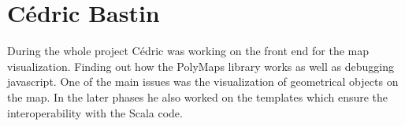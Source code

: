 \section{Cédric Bastin}

During the whole project Cédric was working on the front end for the map visualization. Finding out how the PolyMaps library works as well as debugging javascript. One of the main issues was the visualization of geometrical objects on the map. In the later phases he also worked on the templates which ensure the interoperability with the Scala code.
